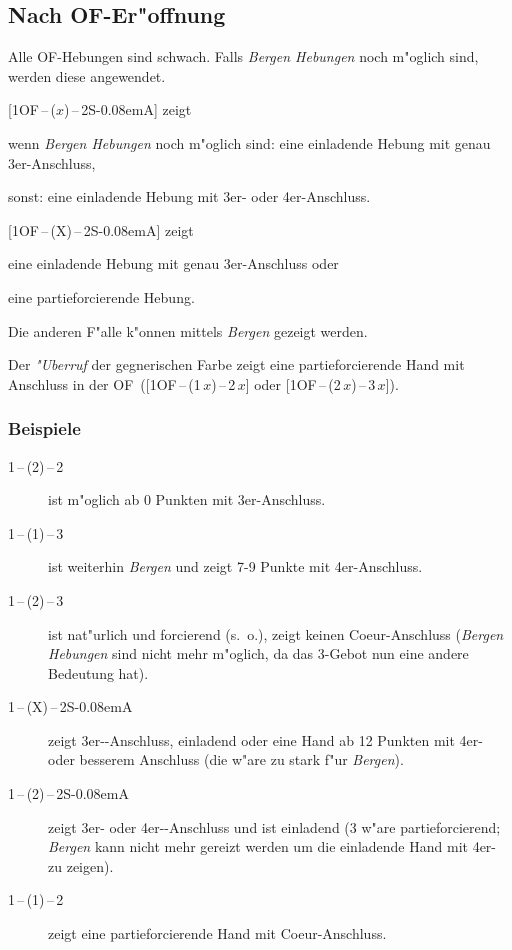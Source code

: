 \documentclass[11pt,german,twocolumn]{scrartcl}
\def\pik{\nobreak\hspace{\cardskip}\Sp\xspace}
\def\coe{\nobreak\hspace{\cardskip}\He\xspace}
\def\kar{\nobreak\hspace{\cardskip}\Di\xspace}
\def\tre{\nobreak\hspace{\cardskip}\Cl\xspace}
\def\pi{\Sp\xspace}
\def\of{\nobreak\hspace{\cardskip}\textsf{OF}\xspace}
\def\ofa{\nobreak\textsf{OF}\xspace}
\def\sa{\nobreak\textsf{S\kern-0.08emA}\xspace}
\def\SA{\nobreak\hspace{\cardskip}\sa}
\def\kontra{\textsf{X}\xspace}
\def\sep{\,--\,}
\newcommand{\conv}[1]{\emph{#1}}
\begin{document}
\subsection{Nach \of-Er"offnung}
\begin{compactitem}
\item Alle \ofa-Hebungen sind schwach.  Falls \conv{Bergen Hebungen}
  noch m"oglich sind, werden diese angewendet.
\item {[}1\of{}\sep($x$){}\sep2\SA{]} zeigt
  \begin{compactitem}
  \item wenn \conv{Bergen Hebungen} noch m"oglich sind: eine einladende
    Hebung mit genau 3er-Anschluss,
  \item sonst: eine einladende Hebung mit 3er- oder 4er-Anschluss.
  \end{compactitem}
\item {[}1\of{}\sep(\kontra){}\sep2\SA{]} zeigt
  \begin{compactitem}
    \item eine einladende Hebung mit genau 3er-Anschluss oder
    \item eine partieforcierende Hebung.
  \end{compactitem}
Die anderen F"alle k"onnen mittels \conv{Bergen} gezeigt werden.
\item Der \conv{"Uberruf} der gegnerischen Farbe zeigt eine
  partieforcierende Hand mit Anschluss in der \of\
  ([1\of{}\sep(1\,$x$){}\sep2\,$x$] oder [1\of{}\sep(2\,$x$){}\sep3\,$x$]).
\end{compactitem}

\subsubsection{Beispiele}
\begin{description}
\item[1\pik{}\sep(2\kar){}\sep2\pik] ist m"oglich ab 0 Punkten mit
  3er-Anschluss.
\item[1\coe{}\sep(1\pik){}\sep3\kar] ist weiterhin \conv{Bergen} und zeigt
  7-9 Punkte mit 4er-Anschluss.
\item[1\coe{}\sep(2\tre){}\sep3\kar] ist nat"urlich und forcierend
  (s.~o.), zeigt keinen Coeur-Anschluss (\conv{Bergen Hebungen} sind
  nicht mehr m"oglich, da das 3\tre-Gebot nun eine andere Bedeutung
  hat).
\item[1\pik{}\sep(X){}\sep2\SA] zeigt 3er-\pi-Anschluss, einladend oder
  eine Hand ab 12 Punkten mit 4er- oder besserem Anschluss (die w"are
  zu stark f"ur \conv{Bergen}).
\item[1\pik{}\sep(2\kar){}\sep2\SA] zeigt 3er- oder 4er-\pi-Anschluss und
  ist einladend (3\kar w"are partieforcierend; \conv{Bergen} kann
  nicht mehr gereizt werden um die einladende Hand mit 4er-\pi{}
  zu zeigen).
\item[1\coe{}\sep(1\pik){}\sep2\pik] zeigt eine partieforcierende Hand mit
  Coeur-Anschluss.
\end{description}
\end{document}
